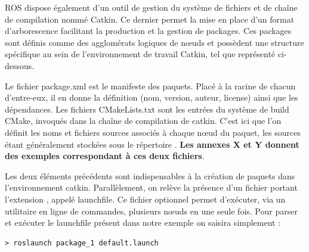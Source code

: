 \gls{ROS} dispose également d'un outil de gestion du système de fichiers et de cha\^{i}ne de compilation nommé \gls{Catkin}.
Ce dernier permet la mise en place d'un format d'arborescence facilitant la production et la gestion de packages.
Ces packages sont définis comme des agglomérats logiques de n\oe{}uds et possèdent une structure spécifique au sein de l'environnement de travail \gls{Catkin}, tel que représenté ci-dessous. 
\\
\renewcommand*\DTstylecomment{\rmfamily\color{red}}

Le fichier package.xml\cite{Bib_ROS_package} est le manifeste des paquets. Placé à la racine de chacun d'entre-eux, il en donne la définition (nom, version, auteur, license) ainsi que les dépendances. 
Les fichiers CMakeLists.txt\cite{Bib_ROS_manifeste} sont les entrées du système de build CMake, invoqués dans la chaîne de compilation de catkin. 
C'est ici que l'on définit les noms et fichiers sources associés à chaque n\oe{}ud du paquet, les sources étant généralement stockées sous le répertoire . 
\textbf{Les annexes X et Y donnent des exemples correspondant à ces deux fichiers}. 

Les deux éléments précédents sont indispensables à la création de paquets dans l'environnement catkin. 
Parallèlement, on relève la présence d'un fichier portant l'extension , appelé launchfile.  
Ce fichier optionnel permet d'exécuter, via un utilitaire en ligne de commandes, plusieurs n\oe{}uds en une seule fois. 
Pour parser et exécuter le launchfile présent dans notre exemple on saisira simplement :

\begin{lstlisting}[style=custombash]
> roslaunch package_1 default.launch
\end{lstlisting}


